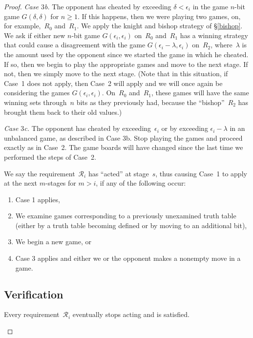\documentclass{LMCS}
\newcommand{\0}{\mathbf{0}}
\newcommand{\<}{\langle}
\renewcommand{\>}{\rangle}
\begin{document}
\begin{proof}
\smallskip
{\em Case $3$b.} The opponent has cheated by exceeding $\delta<\epsilon_i$ in
the game $n$-bit game $G(\delta,\delta)$ for $n\geq 1$.  If this happens,
then we were playing two games, on, for example,~$R_0$ and~$R_1$.  We apply
the knight and bishop strategy of \S\ref{bishop}.  We ask if either new
$n$-bit game $G(\epsilon_i,\epsilon_i)$ on~$R_0$ and~$R_1$ has a winning
strategy that could cause a disagreement with the game
$G(\epsilon_i-\lambda,\epsilon_i)$ on~$R_2$, where~$\lambda$ is the amount
used by the opponent since we started the game in which he cheated.  If so,
then we begin to play the appropriate games and move to the next stage.  If
not, then we simply move to the next stage.  (Note that in this situation, if
Case~1 does not apply, then Case~2 will apply and we will once again be
considering the games $G(\epsilon_i,\epsilon_i)$.  On~$R_0$ and~$R_1$, these
games will have the same winning sets through~$n$ bits as they previously
had, because the ``bishop''~$R_2$ has brought them back to their old values.)

\smallskip
{\em Case $3$c.} The opponent has cheated by exceeding~$\epsilon_i$ or by
exceeding $\epsilon_i-\lambda$ in an unbalanced game, as described in Case
3b. Stop playing the games and proceed exactly as in Case~2. The game boards
will have changed since the last time we performed the steps of Case~2.

\begin{rem}\label{rem-acted}
We say the requirement~$\mathcal{R}_i$ has ``acted'' at stage~$s$, thus
causing Case~1 to apply at the next $m$-stages for $m>i$, if any of the
following occur:
\begin{enumerate}[label=(\roman*)]
\item Case 1 applies,
\item We examine games corresponding to a previously unexamined
    truth table (either by a truth table becoming defined or by moving to
    an additional bit),
\item We begin a new game, or
\item Case 3 applies and either we or the opponent makes a nonempty
    move in a game.
\end{enumerate}
\end{rem}


\subsection{Verification}

\begin{lem}
Every requirement~$\mathcal{R}_i$ eventually stops acting and is satisfied.
\end{lem}


\end{proof}
\end{document}
